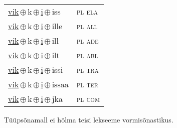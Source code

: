 \begin{minipage}{\textwidth}
\begin{sideways}
\begin{tabular}{l l}
\underline{vik}\,$\oplus$\,k\,$\oplus$\,\underline{i}\,$\oplus$\,iss & \textsc{ pl ela } \\
\underline{vik}\,$\oplus$\,k\,$\oplus$\,\underline{i}\,$\oplus$\,ille & \textsc{ pl all } \\
\underline{vik}\,$\oplus$\,k\,$\oplus$\,\underline{i}\,$\oplus$\,ill & \textsc{ pl ade } \\
\underline{vik}\,$\oplus$\,k\,$\oplus$\,\underline{i}\,$\oplus$\,ilt & \textsc{ pl abl } \\
\underline{vik}\,$\oplus$\,k\,$\oplus$\,\underline{i}\,$\oplus$\,issi & \textsc{ pl tra } \\
\underline{vik}\,$\oplus$\,k\,$\oplus$\,\underline{i}\,$\oplus$\,issaa & \textsc{ pl ter } \\
\underline{vik}\,$\oplus$\,k\,$\oplus$\,\underline{i}\,$\oplus$\,jka & \textsc{ pl com } \\
\end{tabular}
\end{sideways}
\label{tab:tüüpsõnamall-viki}

\end{minipage}

 
\vspace{1em}
\noindent Tüüpsõnamall  ei hõlma teisi lekseeme vormi\-sõnastikus.

